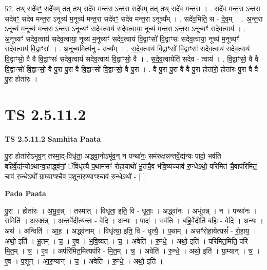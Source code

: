 \documentclass[17pt]{extarticle}
\begin{document}
52. तथ् सदे॑वꣳ॒॒ सदे॑व॒म् तत् तथ् सदे॑व मन्त॒रा ऽन्त॒रा सदे॑व॒म् तत् तथ् सदे॑व मन्त॒रा । . सदे॑व मन्त॒रा ऽन्त॒रा सदे॑वꣳ॒॒ सदे॑व मन्त॒रा ऽनूच्य॑ म॒नूच्य॑ मन्त॒रा सदे॑वꣳ॒॒ सदे॑व मन्त॒रा ऽनूच्य᳚म् । . सदे॑व॒मिति॒ स - दे॒व॒म् । . अ॒न्त॒रा ऽनूच्य॑ म॒नूच्य॑ मन्त॒रा ऽन्त॒रा ऽनूच्यꣳ॑ सदेव॒त्वाय॑ सदेव॒त्वाया॒ नूच्य॑ मन्त॒रा ऽन्त॒रा ऽनूच्यꣳ॑ सदेव॒त्वाय॑ । . अ॒नूच्यꣳ॑ सदेव॒त्वाय॑ सदेव॒त्वाया॒ नूच्य॑ म॒नूच्यꣳ॑ सदेव॒त्वाय॑ वि॒द्वाꣳसो॑ वि॒द्वाꣳसः॑ सदेव॒त्वाया॒ नूच्य॑ म॒नूच्यꣳ॑ सदेव॒त्वाय॑ वि॒द्वाꣳसः॑ । . अ॒नूच्य॒मित्य॑नु - उच्य᳚म् । . स॒दे॒व॒त्वाय॑ वि॒द्वाꣳसो॑ वि॒द्वाꣳसः॑ सदेव॒त्वाय॑ सदेव॒त्वाय॑ वि॒द्वाꣳसो॒ वै वै वि॒द्वाꣳसः॑ सदेव॒त्वाय॑ सदेव॒त्वाय॑ वि॒द्वाꣳसो॒ वै । . स॒दे॒व॒त्वायेति॑ सदेव - त्वाय॑ । . वि॒द्वाꣳसो॒ वै वै वि॒द्वाꣳसो॑ वि॒द्वाꣳसो॒ वै पु॒रा पु॒रा वै वि॒द्वाꣳसो॑ वि॒द्वाꣳसो॒ वै पु॒रा । . वै पु॒रा पु॒रा वै वै पु॒रा होता॑रो॒ होता॑रः पु॒रा वै वै पु॒रा होता॑रः । \newline
\pagebreak
{}
\section*{ TS 2.5.11.2 }

\textbf{TS 2.5.11.2 } \newline
\textbf{Samhita Paata} \newline

पु॒रा होता॑रोऽभूव॒न् तस्मा॒द्-विधृ॑ता॒ अद्ध्वा॒नोऽभू॑व॒न् न पन्था॑नः॒ सम॑रुक्षन्नन्तर्वे॒द्य॑न्यः पादो॒ भव॑ति बहिर्वे॒द्य॑न्योऽथान्वा॒हाद्ध्व॑नां॒ ॅविधृ॑त्यै प॒थामसꣳ॑ रोहा॒याथो॑ भू॒तंचै॒व भ॑वि॒ष्यच्चाव॑ रु॒न्धेऽथो॒ परि॑मितं चै॒वाप॑रिमितं॒ चाव॑ रु॒न्धेऽथो᳚ ग्रा॒म्याꣳश्चै॒व प॒शूना॑र॒ण्याꣳश्चाव॑ रु॒न्धेऽथो॑ - [  ] \newline

\textbf{Pada Paata} \newline

पु॒रा । होता॑रः । अ॒भू॒व॒न्न् । तस्मा᳚त् । विधृ॑ता॒ इति॒ वि - धृ॒ताः॒ । अद्ध्वा॑नः । अभू॑वन्न् । न । पन्था॑नः । समिति॑ । अ॒रु॒क्ष॒न्न् । अ॒न्त॒र्वे॒दीत्य॑न्तः - वे॒दि । अ॒न्यः । पादः॑ । भव॑ति । ब॒हि॒र्वे॒दीति॑ बहिः - वे॒दि । अ॒न्यः । अथ॑ । अन्विति॑ । आ॒ह॒ । अद्ध्व॑नाम् । विधृ॑त्या॒ इति॒ वि - धृ॒त्यै॒ । प॒थाम् । असꣳ॑रोहा॒येत्यसं᳚ - रो॒हा॒य॒ । अथो॒ इति॑ । भू॒तम् । च॒ । ए॒व । भ॒वि॒ष्यत् । च॒ । अवेति॑ । रु॒न्धे॒ । अथो॒ इति॑ । परि॑मित॒मिति॒ परि॑ - मि॒त॒म् । च॒ । ए॒व । अप॑रिमित॒मित्यप॑रि - मि॒त॒म् । च॒ । अवेति॑ । रु॒न्धे॒ । अथो॒ इति॑ । ग्रा॒म्यान् । च॒ । ए॒व । प॒शून् । आ॒र॒ण्यान् । च॒ । अवेति॑ । रु॒न्धे॒ । अथो॒ इति॑ ।  \newline
\end{document}
